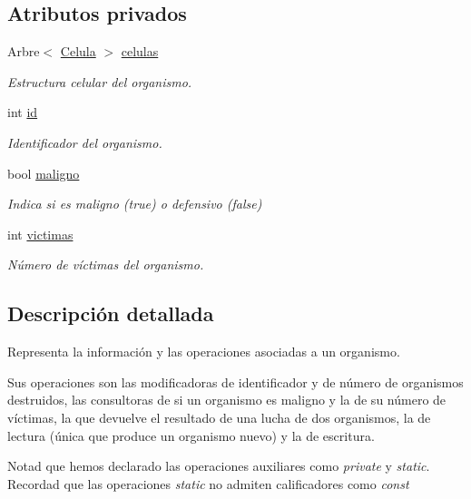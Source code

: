 \subsection*{Atributos privados}
\begin{DoxyCompactItemize}
\item 
Arbre$<$ \hyperlink{class_celula}{Celula} $>$ \hyperlink{class_organismo_abfafb8e55144e295b406ce90951f0c68}{celulas}
\begin{DoxyCompactList}\small\item\em Estructura celular del organismo. \end{DoxyCompactList}\item 
int \hyperlink{class_organismo_a30be1823d3711fec651a5a4b1dc1cee5}{id}
\begin{DoxyCompactList}\small\item\em Identificador del organismo. \end{DoxyCompactList}\item 
bool \hyperlink{class_organismo_a85a5d1b9d31fa209d1ed0d596dbbed61}{maligno}
\begin{DoxyCompactList}\small\item\em Indica si es maligno (true) o defensivo (false) \end{DoxyCompactList}\item 
int \hyperlink{class_organismo_abb3e56487a080df544a6ff96e5e42520}{victimas}
\begin{DoxyCompactList}\small\item\em Número de víctimas del organismo. \end{DoxyCompactList}\end{DoxyCompactItemize}


\subsection{Descripción detallada}
Representa la información y las operaciones asociadas a un organismo. 

Sus operaciones son las modificadoras de identificador y de número de organismos destruidos, las consultoras de si un organismo es maligno y la de su número de víctimas, la que devuelve el resultado de una lucha de dos organismos, la de lectura (única que produce un organismo nuevo) y la de escritura.

Notad que hemos declarado las operaciones auxiliares como {\itshape private} y {\itshape static}. Recordad que las operaciones {\itshape static} no admiten calificadores como {\itshape const} 

